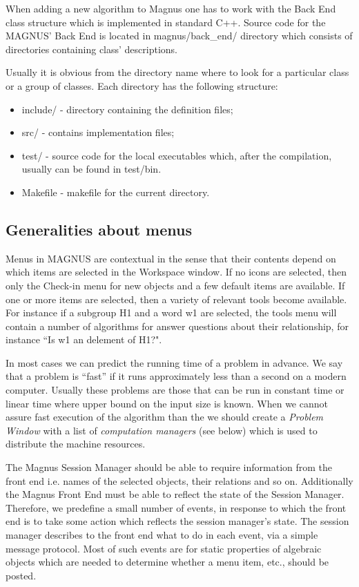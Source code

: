 \documentclass[12pt]{article}
\def\magnus{MAGNUS }
\def\nsmagnus{MAGNUS}
\begin{document}
  When adding a new algorithm to Magnus  one has to work with the Back End 
  class structure  which  is implemented  in standard C++.
  Source code for the \nsmagnus' Back End is located in magnus/back\_end/ directory 
  which consists of directories containing class' descriptions. 



Usually it is obvious from the directory name where to look for a particular 
class or a group of classes. Each directory has the following structure: 
  \begin{itemize}
  \item include/ - directory containing the definition files;
  \item src/ - contains implementation files;
  \item test/ -  source code for the local executables which, after the 
  compilation,
   usually can be found in test/bin.
  \item Makefile - makefile for the current directory.
  \end{itemize}

 
  \subsection{Generalities about menus} Menus in \magnus are contextual
in the sense that their contents depend on which items are selected
in the Workspace window.  If no icons are selected, then only the Check-in
menu for new objects and a few default items are available. If one or more
items are selected, then a variety of relevant tools become available.
For instance if a subgroup H1 and a word w1 are selected, the tools menu 
will contain a number of algorithms for answer questions about their
relationship, for instance ``Is w1 an delement of H1?".


  In most cases we can predict the running time of a problem in advance.
  We say that a problem is ``fast''  if it runs approximately less than a
  second on a modern computer. Usually these problems are those that
  can be run in constant time or linear time where upper bound on the 
  input size is known. When we cannot assure fast execution of the algorithm
  than the we should create a {\em Problem Window} with a list of {\em computation
  managers} (see below) which is used to distribute the machine resources.


     The Magnus Session Manager should be able to require information from 
  the front end i.e. names of the selected objects, their relations
  and so on.  Additionally the Magnus Front End must be able to reflect the state 
  of the Session Manager.  Therefore, we predefine a small number of events, 
  in response to
   which the front end is to take some action which reflects the session manager's
   state. The session manager describes to the front end what to do in each event, 
  via a simple message  protocol. 
  Most of such events  are for static properties of algebraic objects which
    are needed to determine whether a menu item, etc., should be posted.
\end{document}
